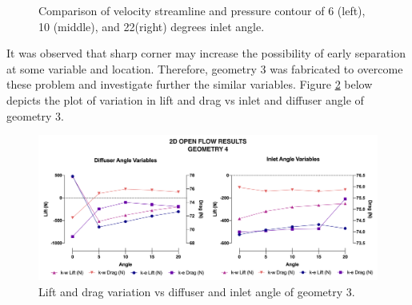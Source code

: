 \begin{figure}[!hb]
   \noindent{}
   \caption{Comparison of velocity streamline and pressure contour of 6 (left), 10 (middle), and 22(right) degrees inlet angle. }
   \label{fig:A1_Contour_inlet_compare}
\end{figure}

\noindent It was observed that sharp corner may increase the possibility of early separation at some variable and location. Therefore, geometry 3 was fabricated to overcome these problem and investigate further the similar variables. Figure \ref{fig:2D_OF_A4_results} below depicts the plot of variation in lift and drag vs inlet and diffuser angle of geometry 3.

\begin{figure}[htb!]
    \centering
    \includegraphics[scale=0.6]{Figures/Graph/2D_OF_A4.png}
    \caption{Lift and drag variation vs diffuser and inlet angle of geometry 3.}
    \label{fig:2D_OF_A4_results}
\end{figure}

